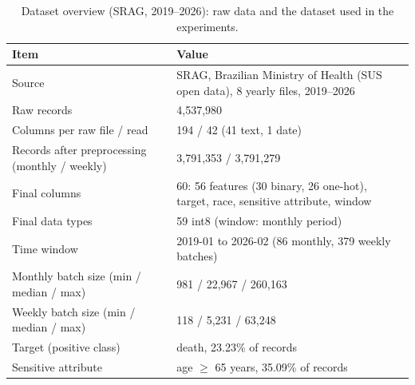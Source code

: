 \begin{table}
  \small
  \caption{Dataset overview (SRAG, 2019--2026): raw data and the dataset used in the experiments.}
  \label{tab:dataset-overview}
  \begin{tabular}{ll}
    \toprule
    Item & Value \\
    \midrule
    Source & SRAG, Brazilian Ministry of Health (SUS open data), 8 yearly files, 2019--2026 \\
    Raw records & 4,537,980 \\
    Columns per raw file / read & 194 / 42 (41 text, 1 date) \\
    Records after preprocessing (monthly / weekly) & 3,791,353 / 3,791,279 \\
    Final columns & 60: 56 features (30 binary, 26 one-hot), target, race, sensitive attribute, window \\
    Final data types & 59 int8 (window: monthly period) \\
    Time window & 2019-01 to 2026-02 (86 monthly, 379 weekly batches) \\
    Monthly batch size (min / median / max) & 981 / 22,967 / 260,163 \\
    Weekly batch size (min / median / max) & 118 / 5,231 / 63,248 \\
    Target (positive class) & death, 23.23\% of records \\
    Sensitive attribute & age $\geq$ 65 years, 35.09\% of records \\
    \bottomrule
  \end{tabular}
\end{table}
